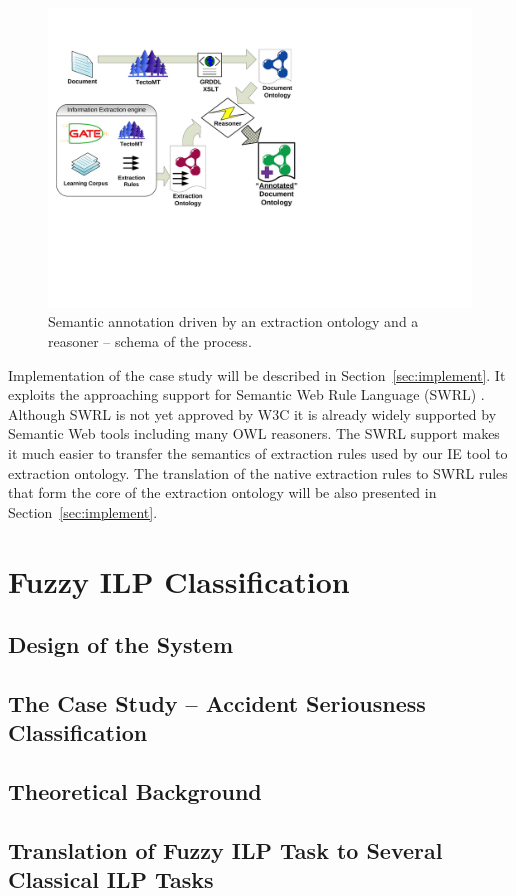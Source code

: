 \begin{figure}
\centerline{\includegraphics[angle=-90, width=0.7\hsize]{semantic_rules_app_schema}}
\caption{Semantic annotation driven by an extraction ontology and a reasoner -- schema of the process.}
\label{img:rules_app_schema}
\end{figure}

Implementation of the case study will be described in Section~\ref{sec:implement}. It exploits the approaching support for Semantic Web Rule Language (SWRL) \citep{SWRL}. Although SWRL is not yet approved by W3C it is already widely supported by Semantic Web tools including many OWL reasoners. The SWRL support makes it much easier to transfer the semantics of extraction rules used by our IE tool to extraction ontology. The translation of the native extraction rules to SWRL rules that form the core of the extraction ontology will be also presented in Section~\ref{sec:implement}.




\section{Fuzzy ILP Classification}

\subsection{Design of the System}

\subsection{The Case Study – Accident Seriousness Classification}

\subsection{Theoretical Background}

\subsection{Translation of Fuzzy ILP Task to Several Classical ILP Tasks}
